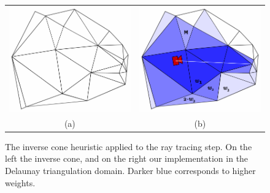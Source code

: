 \begin{figure}
\centering
\begin{tabular}{cc}
\includegraphics[width=0.35\columnwidth]{./img//conicCarvingContinueOK}&
\includegraphics[width=0.35\columnwidth]{./img//conicCarvingOK}\\
(a) & (b)
\end{tabular}
\caption{The inverse cone heuristic applied to the ray tracing step. On the left the inverse cone, and on the right our implementation in the Delaunay triangulation domain. Darker blue corresponds to higher weights.}
\label{fig:ConicCarving}
\end{figure}





